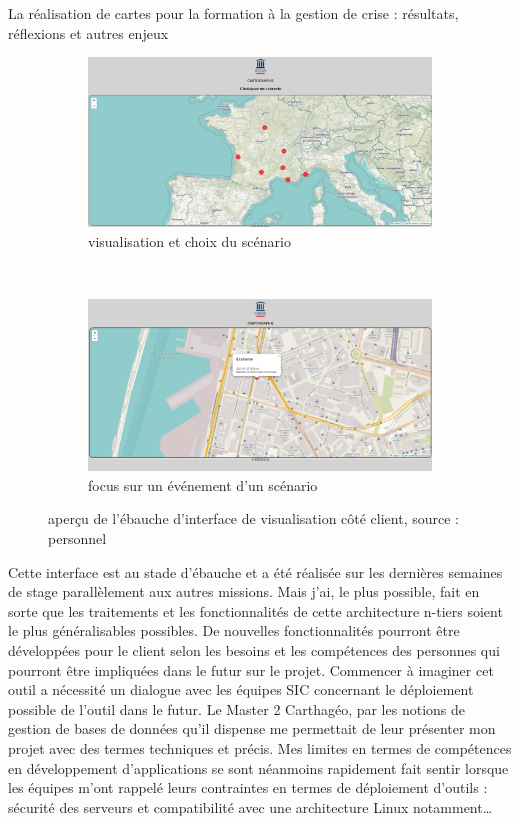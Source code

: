 \documentclass[10pt,a4paper]{report} %
\begin{document}
\begin{part}{La réalisation de cartes pour la formation à la gestion de crise : résultats, réflexions et autres enjeux}
\begin{figure}[!t]
\begin{subfigure}{\textwidth}
    \centering
    \includegraphics[width=.9\linewidth]{figures/outil1.png}
    \caption{visualisation et choix du scénario}
    \label{figure:sousfig1}
  \end{subfigure}\\
  \begin{subfigure}{\textwidth}
    \centering
    \includegraphics[width=.9\linewidth]{figures/outil2.png}
    \caption{focus sur un événement d'un scénario}
    \label{figure:sousfig2}
  \end{subfigure}
\caption{aperçu de l’ébauche d’interface de visualisation côté client, source : personnel}
\label{figure:figure}
\end{figure}

Cette interface est au stade d’ébauche et a été réalisée sur les dernières semaines de stage parallèlement aux autres missions. Mais j’ai, le plus possible, fait en sorte que les traitements et les fonctionnalités de cette architecture n-tiers soient le plus généralisables possibles. De nouvelles fonctionnalités pourront être développées pour le client selon les besoins et les compétences des personnes qui pourront être impliquées dans le futur sur le projet. Commencer à imaginer cet outil a nécessité un dialogue avec les équipes SIC concernant le déploiement possible de l’outil dans le futur. Le Master 2 Carthagéo, par les notions de gestion de bases de données qu’il dispense me permettait de leur présenter mon projet avec des termes techniques et précis. Mes limites en termes de compétences en développement d’applications se sont néanmoins rapidement fait sentir lorsque les équipes m’ont rappelé leurs contraintes en termes de déploiement d’outils : sécurité des serveurs et compatibilité avec une architecture Linux notamment…


\end{part}
\end{document}
